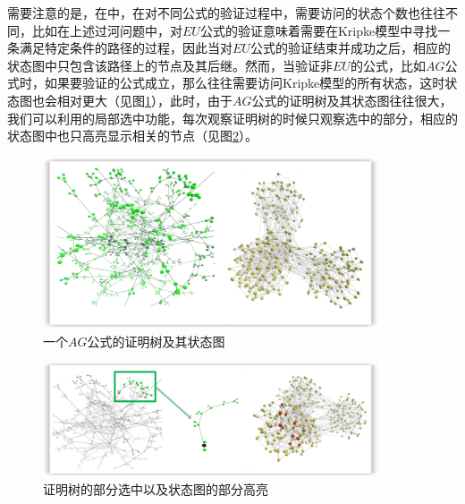 	需要注意的是，在\sctlprov{}中，在对不同公式的验证过程中，需要访问的状态个数也往往不同，比如在上述过河问题中，对$EU$公式的验证意味着需要在Kripke模型中寻找一条满足特定条件的路径的过程，因此当对$EU$公式的验证结束并成功之后，相应的状态图中只包含该路径上的节点及其后继。然而，当验证非$EU$的公式，比如$AG$公式时，如果要验证的公式成立，那么\sctlprov{}往往需要访问Kripke模型的所有状态，这时状态图也会相对更大（见图\ref{vmdv:example:ag}），此时，由于$AG$公式的证明树及其状态图往往很大，我们可以利用的局部选中功能，每次观察证明树的时候只观察选中的部分，相应的状态图中也只高亮显示相关的节点（见图\ref{vmdv:example:ag:part}）。
	\begin{figure}[h!]
		\centering
		\includegraphics[width=10cm]{Img/ag_proof_state.png}
		\caption{一个$AG$公式的证明树及其状态图}
		\label{vmdv:example:ag}
	\end{figure}
	\begin{figure}[h!]
		\centering
		\includegraphics[width=10cm]{Img/ag_part_detail.png}
		\caption{证明树的部分选中以及状态图的部分高亮}
		\label{vmdv:example:ag:part}
	\end{figure}
